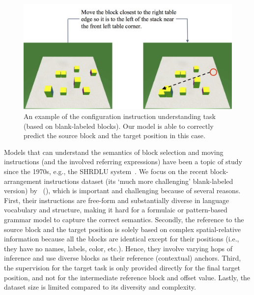 \documentclass[letterpaper]{article} %
\newcommand{\newcite}[1]{\citeauthor{#1} (\citeyear{#1})}
\begin{document}
\begin{figure}
\centering
\includegraphics[width=0.98\linewidth]{Intro_sample.jpg}
\caption{An example of the configuration instruction understanding task (based on blank-labeled blocks). Our model is able to correctly predict the source block and the target position in this case.
}
\label{fig:problem}
\end{figure}


Models that can understand the semantics of block selection and moving instructions (and the involved referring expressions) have been a topic of study since the 1970s, e.g., the SHRDLU system~\cite{winograd72}.
We focus on the recent block-arrangement instructions dataset (its `much more challenging' blank-labeled version) by~\newcite{bisk2016natural}, which is important and challenging because of several reasons.
First, their instructions are free-form and substantially diverse in language vocabulary and structure, making it hard for a formulaic or pattern-based grammar model to capture the correct semantics. Secondly, the reference to the source block and the target position is solely based on complex spatial-relative information because all the blocks are identical except for their positions (i.e., they have no names, labels, color, etc.). Hence, they involve varying hops of inference and use diverse blocks as their reference (contextual) anchors. Third, the supervision for the target task is only provided directly for the final target position, and not for the intermediate reference block and offset value. Lastly, the dataset size is limited compared to its diversity and complexity.
\end{document}
